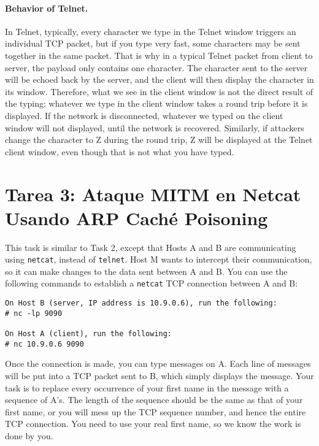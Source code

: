 \paragraph{Behavior of Telnet.}
In Telnet, typically, every character we type in the Telnet window triggers
an individual TCP packet, but if you type very fast, some characters may be 
sent together in the same packet. 
That is why in a typical Telnet packet from client to server, 
the payload only contains one character.  The
character sent to the server will be echoed back by the server, 
and the client will then display the
character in its window. Therefore, what we see in the client window is not the direct result
of the typing; whatever we type in the client window takes a round trip before it is displayed.
If the network is disconnected, whatever we typed on the client window will not displayed,
until the network is recovered. Similarly, if attackers change the character to Z during the
round trip, Z will be displayed at the Telnet client window, even though
that is not what you have typed.




\section{Tarea 3: Ataque MITM en Netcat Usando ARP Caché Poisoning}

This task is similar to Task 2, except that
Hosts A and B are communicating using \texttt{netcat}, instead of \texttt{telnet}.
Host M wants to intercept their
communication, so it can make changes to the data sent between A and B.
You can use the following commands to establish a \texttt{netcat} TCP
connection between A and B:


\begin{lstlisting}
On Host B (server, IP address is 10.9.0.6), run the following:
# nc -lp 9090

On Host A (client), run the following:
# nc 10.9.0.6 9090
\end{lstlisting}
 

Once the connection is made, you can type messages on A.
Each line of messages will be put into a TCP packet sent 
to B, which simply displays the message.  
Your task is to replace every occurrence of your first name in the 
message with a sequence of A's. The length of the sequence should be the 
same as that of your first name, or you will mess up the TCP sequence
number, and hence the entire TCP connection. You need to use your real
first name, so we know the work is done by you.  



